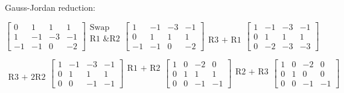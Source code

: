 \documentclass[]{article}
\begin{document}
Gauss-Jordan reduction:

\[ \begin{bmatrix}
0  &  1 & 1  &  1 \\
1  & -1 & -3 & -1 \\
-1 & -1 & 0  & -2
\end{bmatrix}
\begin{matrix}
\text{Swap} \\
\text{R1 \& R2} \\
\\
\end{matrix}
\begin{bmatrix}
1  & -1 & -3 & -1 \\
0  &  1 & 1  &  1 \\
-1 & -1 & 0  & -2
\end{bmatrix}
\begin{matrix}
\\
\\
\text{R3 + R1}
\end{matrix}
\begin{bmatrix}
1  & -1 & -3 & -1 \\
0  &  1 & 1  &  1 \\
0 & -2 & -3  & -3
\end{bmatrix} \]

\[
\begin{matrix}
\\
\\
\text{R3 + 2R2}
\end{matrix}
\begin{bmatrix}
1  & -1 & -3 & -1 \\
0  &  1 & 1  &  1 \\
0  &  0 & -1 & -1
\end{bmatrix}
\begin{matrix}
\text{R1 + R2} \\
\\
\\
\end{matrix}
\begin{bmatrix}
1  &  0 & -2 & 0 \\
0  &  1 & 1  &  1 \\
0  &  0 & -1 & -1
\end{bmatrix}
\begin{matrix}
\\
\text{R2 + R3} \\
\\
\end{matrix}
\begin{bmatrix}
1  &  0 & -2 & 0 \\
0  &  1 & 0  & 0 \\
0  &  0 & -1 & -1
\end{bmatrix}
\]
\end{document}
